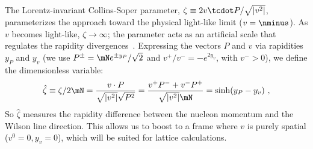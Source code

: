 The Lorentz-invariant Collins-Soper parameter, $\zeta \equiv 2 v \tcdot P/\sqrt{|v^2|}$, parameterizes the approach toward the physical light-like limit ($v = \nminus$). As $v$ becomes light-like, $\zeta \rightarrow \infty$; the parameter acts as an artificial scale that regulates the rapidity divergences~\cite{Collins:1981uk, Idilbi:2004vb, Aybat:2011ge}. Expressing the vectors $P$ and $v$ via rapidities $y_P$ and $y_v$ (we use $P^{\pm} = \mN e^{\pm y_P} / \sqrt{2}$ and $v^+/v^- = - e^{2y_v}$, with $v^->0$), we define the dimensionless variable:
\begin{equation}
	\hat \zeta \equiv \zeta / 2 \mN =  \frac{v \cdot P}{\sqrt{|v^2|} \sqrt{P^2}}=  \frac{v^+P^-+v^-P^+}{\sqrt{|v^2|} \mN} = \sinh(y_P - y_v)\ ,
	\label{eq-zeta}
\end{equation}
So $\hat \zeta$ measures the rapidity difference between the nucleon momentum and the Wilson line direction. This allows us to boost to a frame where $v$ is purely spatial ($v^0 = 0, y_v = 0$), which will be suited for lattice calculations.

